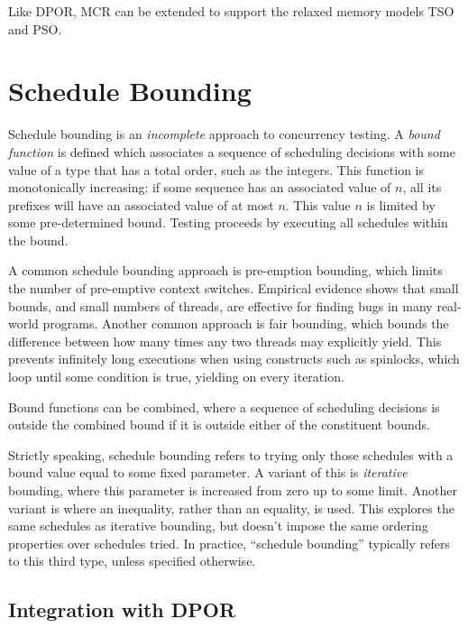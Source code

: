 Like DPOR, MCR can be extended to support the relaxed memory models TSO and
PSO\cite{huang2016}.

\section{Schedule Bounding}
\label{sec:sct-bounding}

Schedule bounding\cite{emmi2011,musuvathi2008,musuvathi2007} is an
\emph{incomplete} approach to concurrency testing.  A \emph{bound function} is
defined which associates a sequence of scheduling decisions with some value of a
type that has a total order, such as the integers.  This function is
monotonically increasing: if some sequence has an associated value of $n$, all
its prefixes will have an associated value of at most $n$.  This value $n$ is
limited by some pre-determined bound.  Testing proceeds by executing all
schedules within the bound.

A common schedule bounding approach is pre-emption bounding\cite{musuvathi2007},
which limits the number of pre-emptive context switches.  Empirical
evidence\cite{thomson2014} shows that small bounds, and small numbers of
threads, are effective for finding bugs in many real-world programs.  Another
common approach is fair bounding\cite{musuvathi2008}, which bounds the
difference between how many times any two threads may explicitly yield.  This
prevents infinitely long executions when using constructs such as spinlocks,
which loop until some condition is true, yielding on every iteration.

Bound functions can be combined, where a sequence of scheduling decisions is
outside the combined bound if it is outside either of the constituent bounds.

Strictly speaking, schedule bounding refers to trying only those schedules with
a bound value equal to some fixed parameter.  A variant of this is
\emph{iterative} bounding, where this parameter is increased from zero up to
some limit\cite{musuvathi2007}.  Another variant is where an inequality, rather
than an equality, is used.  This explores the same schedules as iterative
bounding, but doesn't impose the same ordering properties over schedules tried.
In practice, ``schedule bounding'' typically refers to this third type, unless
specified otherwise.

\subsection{Integration with DPOR}

